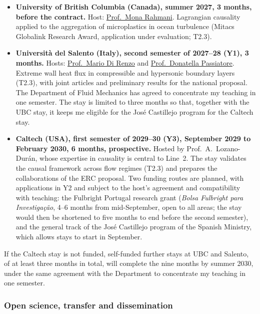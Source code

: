 \documentclass[11pt]{article}
\newcommand{\NEW}[1]{\iffinal #1\else{\color{red}#1}\fi}
\begin{document}
\begin{itemize}
  \item \textbf{University of British Columbia (Canada), summer 2027, 3 months, before the
  contract.} Host: \href{https://chbe.ubc.ca/mona-rahmani/}{Prof.\ Mona Rahmani}. Lagrangian
  causality applied to the aggregation of microplastics in ocean turbulence (Mitacs Globalink
  Research Award, \NEW{application under evaluation}; T2.3).
  
  \item \textbf{Universit\`a del Salento (Italy), second semester of 2027--28 (Y1), 3 months.} Hosts:
  \href{https://www.unisalento.it/scheda-utente/-/people/mario.direnzo}{Prof.\ Mario Di Renzo}
  and \href{https://www.unisalento.it/scheda-utente/-/people/donatella.passiatore}{Prof.\
  Donatella Passiatore}. Extreme wall heat flux in compressible and hypersonic boundary layers (T2.3), with
  joint articles and preliminary results for the national proposal. The Department of Fluid
  Mechanics has agreed to concentrate my teaching in one semester. The stay is limited to
  three months so that, together with the UBC stay, it keeps me eligible for the José
  Castillejo program for the Caltech stay.
  
  \item \textbf{Caltech (USA), first semester of 2029--30 (Y3), September 2029 to February 2030, 6 months,
  prospective.} Hosted by Prof.\ A.\ Lozano-Dur\'an, whose expertise in causality is central to Line~2. The stay validates the causal framework across flow regimes (T2.3) and prepares the collaborations of the ERC proposal. Two funding routes are planned,
  with applications in Y2 and subject to the host's agreement and compatibility with
  teaching: the Fulbright Portugal research grant (\emph{Bolsa Fulbright para
  Investiga\c{c}\~ao}, 4--6 months from mid-September, open to all areas; the stay would then be
  shortened to five months to end before the second semester), and the general track of the José
  Castillejo program of the Spanish Ministry, which allows stays to start in September.
\end{itemize}
If the Caltech stay is not funded, self-funded further stays at UBC and Salento, of at least three
months in total, will complete the nine months by summer 2030, under the same agreement with the
Department to concentrate my teaching in one semester.

\subsubsection{Open science, transfer and dissemination}
\end{document}
